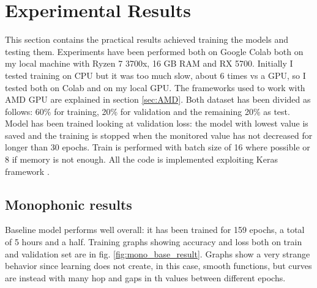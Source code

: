 \documentclass{article}
\begin{document}

\section{Experimental Results}
\label{sec:results}

This section contains the practical results achieved training the models and testing them. Experiments have been performed both on Google Colab \cite{colab} both on my local machine with Ryzen 7 3700x, 16 GB RAM and RX 5700. Initially I tested training on CPU but it was too much slow, about 6 times vs a GPU, so I tested both on Colab and on my local GPU. The frameworks used to work with AMD GPU are explained in section \ref{sec:AMD}.\newline
Both dataset has been divided as follows: 60\% for training, 20\% for validation and the remaining 20\% as test. Model has been trained looking at validation loss: the model with lowest value is saved and the training is stopped when the monitored value has not decreased for longer than 30 epochs. Train is performed with batch size of 16 where possible or 8 if memory is not enough. All the code is implemented exploiting Keras framework \cite{keras}.

\subsection{Monophonic results}
\label{subsec:mono_results}

Baseline model performs well overall: it has been trained for 159 epochs, a total of 5 hours and a half. Training graphs showing accuracy and loss both on train and validation set are in fig. \ref{fig:mono_base_result}. Graphs show a very strange behavior since learning does not create, in this case, smooth functions, but curves are instead with many hop and gaps in th values between different epochs. 
\end{document}
